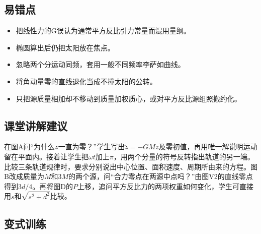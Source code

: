 \documentclass[UTF8,fontset=fandol,a4paper,11pt]{ctexart}
\begin{document}
\subsection*{易错点}

\begin{itemize}
\item 把线性力的G误认为通常平方反比引力常量而混用量纲。
\item 椭圆算出后仍把太阳放在焦点。
\item 忽略两个分运动同频，套用一般不同频率李萨如曲线。
\item 将角动量零的直线退化当成不撞太阳的公转。
\item 只把源质量相加却不移动到质量加权质心，或对平方反比源组照搬约化。
\end{itemize}



\subsection*{课堂讲解建议}

在图A问“为什么$z$一直为零？”学生写出$\ddot z=-GMz$及零初值，再用唯一解说明运动留在平面内。接着让学生把$\omega t$加上$\pi$，用两个分量的符号反转指出轨道的另一端。比较三条轨道规律时，要求分别说出中心位置、面积速度、周期所由来的方程。图B改成质量为$M$和$3M$的两个源，问“合力零点在两源中点吗？”由图V2的直线零点得到$3d/4$。再将图D的$P$上移，追问平方反比力的两项权重如何变化，学生可直接用$s$和$\sqrt{s^2+d^2}$比较。



\subsection*{变式训练}
\end{document}
